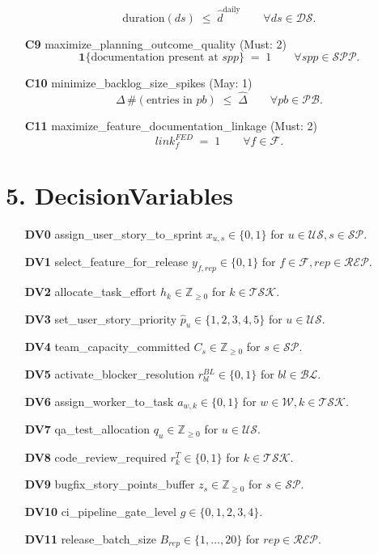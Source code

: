 \documentclass[11pt,a4paper]{article}
\begin{document}
\begin{itemize}[leftmargin=1.2cm]
  \[
    \mathrm{duration}(ds) \;\le\; \widehat{d}^{\text{daily}} \qquad \forall ds\in\mathcal{DS}.
  \]
  \item[\textbf{C9} maximize\_planning\_outcome\_quality \; (Must: 2)]
  \[
    \mathbf{1}\{\text{documentation present at } spp\} \;=\; 1 \qquad \forall spp\in\mathcal{SPP}.
  \]
  \item[\textbf{C10} minimize\_backlog\_size\_spikes \; (May: 1)]
  \[
    \Delta\,\#(\text{entries in } pb) \;\le\; \widehat{\Delta} \qquad \forall pb\in\mathcal{PB}.
  \]
  \item[\textbf{C11} maximize\_feature\_documentation\_linkage \; (Must: 2)]
  \[
    link^{FED}_f \;=\; 1 \qquad \forall f\in\mathcal{F}.
  \]
\end{itemize}

\section{5. DecisionVariables}
\begin{itemize}[leftmargin=1.2cm]
  \item[\textbf{DV0} assign\_user\_story\_to\_sprint] $x_{u,s}\in\{0,1\}$ \; for $u\in\mathcal{US}, s\in\mathcal{SP}$.
  \item[\textbf{DV1} select\_feature\_for\_release] $y_{f,rep}\in\{0,1\}$ \; for $f\in\mathcal{F}, rep\in\mathcal{REP}$.
  \item[\textbf{DV2} allocate\_task\_effort] $h_k\in\mathbb{Z}_{\ge0}$ \; for $k\in\mathcal{TSK}$.
  \item[\textbf{DV3} set\_user\_story\_priority] $\hat{p}_u\in\{1,2,3,4,5\}$ \; for $u\in\mathcal{US}$.
  \item[\textbf{DV4} team\_capacity\_committed] $C_s\in\mathbb{Z}_{\ge0}$ \; for $s\in\mathcal{SP}$.
  \item[\textbf{DV5} activate\_blocker\_resolution] $r^{BL}_{bl}\in\{0,1\}$ \; for $bl\in\mathcal{BL}$.
  \item[\textbf{DV6} assign\_worker\_to\_task] $a_{w,k}\in\{0,1\}$ \; for $w\in\mathcal{W}, k\in\mathcal{TSK}$.
  \item[\textbf{DV7} qa\_test\_allocation] $q_u\in\mathbb{Z}_{\ge0}$ \; for $u\in\mathcal{US}$.
  \item[\textbf{DV8} code\_review\_required] $r^T_k\in\{0,1\}$ \; for $k\in\mathcal{TSK}$.
  \item[\textbf{DV9} bugfix\_story\_points\_buffer] $z_s\in\mathbb{Z}_{\ge0}$ \; for $s\in\mathcal{SP}$.
  \item[\textbf{DV10} ci\_pipeline\_gate\_level] $g\in\{0,1,2,3,4\}$.
  \item[\textbf{DV11} release\_batch\_size] $B_{rep}\in\{1,\dots,20\}$ \; for $rep\in\mathcal{REP}$.
\end{itemize}
\end{document}
